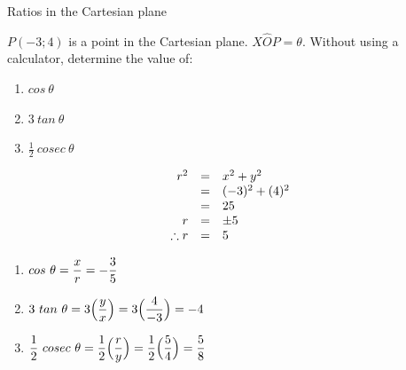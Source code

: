 \begin{wex}{Ratios in the Cartesian plane}
{$P(-3;4)$ is a point in the Cartesian plane. $X\hat{O}P=\theta$. Without using a calculator, determine the value of:
  \begin{enumerate}[noitemsep, label=\textbf{\arabic*}. ] 
   \item $cos~\theta$
\item $3~tan~\theta$
\item $\frac{1}{2}~cosec~\theta$
  \end{enumerate}
}

{
\begin{equation*}
 \begin{array}{ccl}
    \hfill r^{2} &= & x^{2} + y^{2} \hfill \\
\hfill  &=& (-3)^{2} + (4)^{2} \hfill \\
\hfill  &=& 25 \hfill \\
\hfill r &=& \pm 5\hfill \\
\hfill \therefore r &=& 5 \hfill \\ 
\end{array}
\end{equation*}
\begin{enumerate}[noitemsep, label=\textbf{\arabic*}. ] 
   \item $cos~\theta = \dfrac{x}{r} = -\dfrac{3}{5} \vspace{5pt}$
\item $3~tan~\theta = 3\Big(\dfrac{y}{x}\Big) = 3\Big(\dfrac{4}{-3}\Big) = -4 \vspace{5pt}$
\item $\dfrac{1}{2}~cosec~\theta = \dfrac{1}{2}\Big(\dfrac{r}{y}\Big) = \dfrac{1}{2}\Big(\dfrac{5}{4}\Big) = \dfrac{5}{8} \vspace{5pt}$
  \end{enumerate}
}
\end{wex}


